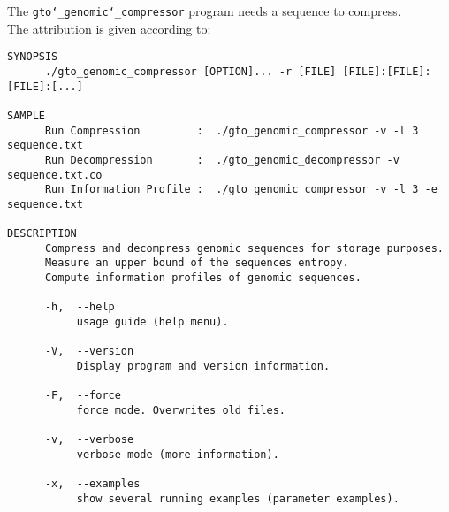 The \texttt{gto\char`_genomic\char`_compressor} program needs a sequence to compress.\\
The attribution is given according to:
\begin{lstlisting}
SYNOPSIS                                                                
      ./gto_genomic_compressor [OPTION]... -r [FILE] [FILE]:[FILE]:[FILE]:[...]          
                                                                        
SAMPLE                                                                  
      Run Compression         :  ./gto_genomic_compressor -v -l 3 sequence.txt           
      Run Decompression       :  ./gto_genomic_decompressor -v sequence.txt.co             
      Run Information Profile :  ./gto_genomic_compressor -v -l 3 -e sequence.txt        
                                                                        
DESCRIPTION                                                             
      Compress and decompress genomic sequences for storage purposes.   
      Measure an upper bound of the sequences entropy.                  
      Compute information profiles of genomic sequences.                
                                                                        
      -h,  --help                                                       
           usage guide (help menu).                                     
                                                                        
      -V,  --version                                                    
           Display program and version information.                     
                                                                        
      -F,  --force                                                      
           force mode. Overwrites old files.                            
                                                                        
      -v,  --verbose                                                    
           verbose mode (more information).                             
                                                                        
      -x,  --examples                                                   
           show several running examples (parameter examples).          
                                                                        

\end{lstlisting}
